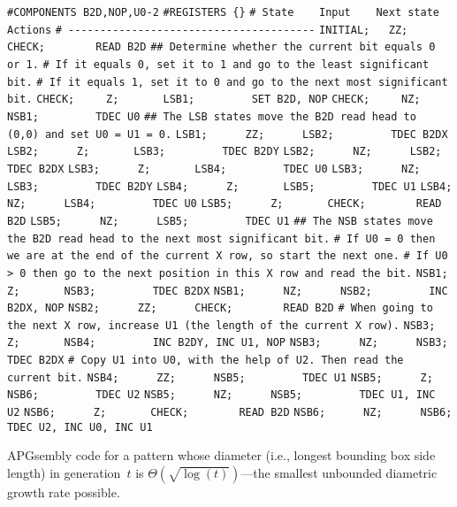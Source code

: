 \begin{apgsembly}
	\begin{algorithmic}\small
		\State \verb|#COMPONENTS B2D,NOP,U0-2|
		\State \verb|#REGISTERS {}|
		\State \verb|# State    Input    Next state    Actions|
		\State \verb|# ---------------------------------------|
		\State \verb|INITIAL;   ZZ;      CHECK;        READ B2D|
		\State
		\State \verb|## Determine whether the current bit equals 0 or 1.|
		\State \verb|# If it equals 0, set it to 1 and go to the least significant bit.|
		\State \verb|# If it equals 1, set it to 0 and go to the next most significant bit.|
		\State \verb|CHECK;     Z;       LSB1;         SET B2D, NOP|
		\State \verb|CHECK;     NZ;      NSB1;         TDEC U0|
		\State
		\State \verb|## The LSB states move the B2D read head to (0,0) and set U0 = U1 = 0.|
		\State \verb|LSB1;      ZZ;      LSB2;         TDEC B2DX|
		\State \verb|LSB2;      Z;       LSB3;         TDEC B2DY|
		\State \verb|LSB2;      NZ;      LSB2;         TDEC B2DX|
		\State \verb|LSB3;      Z;       LSB4;         TDEC U0|
		\State \verb|LSB3;      NZ;      LSB3;         TDEC B2DY|
		\State \verb|LSB4;      Z;       LSB5;         TDEC U1|
		\State \verb|LSB4;      NZ;      LSB4;         TDEC U0|
		\State \verb|LSB5;      Z;       CHECK;        READ B2D|
		\State \verb|LSB5;      NZ;      LSB5;         TDEC U1|
		\State
		\State \verb|## The NSB states move the B2D read head to the next most significant bit.|
		\State \verb|# If U0 = 0 then we are at the end of the current X row, so start the next one.|
		\State \verb|# If U0 > 0 then go to the next position in this X row and read the bit.|
		\State \verb|NSB1;      Z;       NSB3;         TDEC B2DX|
		\State \verb|NSB1;      NZ;      NSB2;         INC B2DX, NOP|
		\State \verb|NSB2;      ZZ;      CHECK;        READ B2D|
		\State
		\State \verb|# When going to the next X row, increase U1 (the length of the current X row).|
		\State \verb|NSB3;      Z;       NSB4;         INC B2DY, INC U1, NOP|
		\State \verb|NSB3;      NZ;      NSB3;         TDEC B2DX|
		\State
		\State \verb|# Copy U1 into U0, with the help of U2. Then read the current bit.|
		\State \verb|NSB4;      ZZ;      NSB5;         TDEC U1|
		\State \verb|NSB5;      Z;       NSB6;         TDEC U2|
		\State \verb|NSB5;      NZ;      NSB5;         TDEC U1, INC U2|
		\State \verb|NSB6;      Z;       CHECK;        READ B2D|
		\State \verb|NSB6;      NZ;      NSB6;         TDEC U2, INC U0, INC U1|
	\end{algorithmic}
	\caption{APGsembly code for a pattern whose diameter (i.e., longest bounding box side length) in generation~$t$ is $\Theta(\sqrt{\log(t)})$---the smallest unbounded diametric growth rate possible.}\label{alg:apgsembly_slow_growth}
\end{apgsembly}

